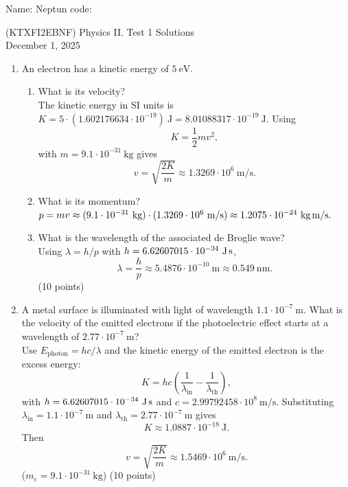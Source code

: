 \documentclass[12pt]{letter}
\begin{document}
Name: \hrulefill \quad Neptun code: \hrulefill

\begin{center}
 (KTXFI2EBNF) Physics II. Test 1 Solutions \\
  December 1, 2025
\end{center}

\bigskip

\begin{enumerate}
\setcounter{enumi}{0}

\item An electron has a kinetic energy of $5\ \text{eV}$. \\

\begin{enumerate}
\item What is its velocity?\\
  
The kinetic energy in SI units is $K = 5\cdot (1.602176634\cdot10^{-19})\ \text{J} = 8.01088317\cdot10^{-19}\ \text{J}$. Using
$$ K=\frac{1}{2} m v^{2}, $$
with $m=9.1\cdot10^{-31}\ \text{kg}$ gives
$$ v=\sqrt{\frac{2K}{m}} \approx 1.3269\cdot10^{6}\ \text{m/s}. $$

\item What is its momentum?\\

$p=m v \approx (9.1\cdot10^{-31}\ \text{kg})\cdot(1.3269\cdot10^{6}\ \text{m/s}) \approx 1.2075\cdot10^{-24}\ \text{kg\,m/s}.$

\item What is the wavelength of the associated de Broglie wave?\\
Using $\lambda = h/p$ with $h=6.62607015\cdot10^{-34}\ \text{J\,s}$,
$$ \lambda=\frac{h}{p}\approx 5.4876\cdot10^{-10}\ \text{m} \approx 0.549\ \text{nm}. $$
\hfill (10 points)
 \end{enumerate}


\bigskip
\item A metal surface is illuminated with light of wavelength $1.1\cdot10^{-7}\ \text{m}$. What is the velocity of the emitted electrons if the photoelectric effect starts at a wavelength of $2.77\cdot10^{-7}\ \text{m}$? \\
  
Use $E_\text{photon}=hc/\lambda$ and the kinetic energy of the emitted electron is the excess energy:
$$ K = hc\left(\frac{1}{\lambda_\text{in}}-\frac{1}{\lambda_\text{th}}\right), $$
with $h=6.62607015\cdot10^{-34}\ \text{J\,s}$ and $c=2.99792458\cdot10^{8}\ \text{m/s}$. Substituting $\lambda_\text{in}=1.1\cdot10^{-7}\ \text{m}$ and $\lambda_\text{th}=2.77\cdot10^{-7}\ \text{m}$ gives
$$ K \approx 1.0887\cdot10^{-18}\ \text{J}. $$
Then
$$ v=\sqrt{\frac{2K}{m}} \approx 1.5469\cdot10^{6}\ \text{m/s}. $$
($m_e=9.1\cdot10^{-31}\ \text{kg}$) \hfill (10 points)


\end{enumerate}
\end{document}
